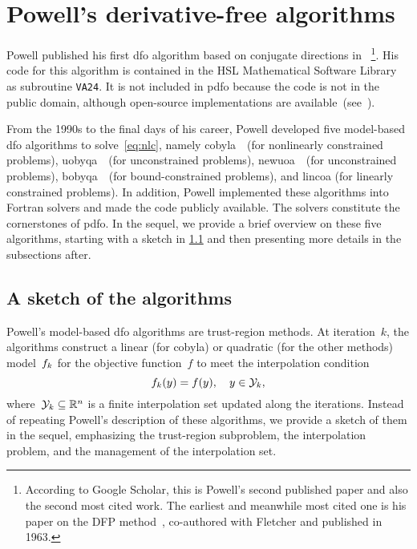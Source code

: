 \documentclass[11pt,draft]{article}
\numberwithin{equation}{section}
\newcommand{\R}{\mathbb{R}}
\newcommand{\obj}{f}
\newcommand{\objm}[1][k]{\obj\ifthenelse{\equal{#1}{}}{}{_{#1}}}
\newcommand{\xpt}[1][k]{\mathcal{Y}\ifthenelse{\equal{#1}{}}{}{_{#1}}}
\begin{document}
\section{Powell's derivative-free algorithms}
\label{sec:powell}

Powell published his first \gls{dfo} algorithm based on conjugate directions in \citeyear{Powell_1964}~\cite{Powell_1964}\footnote{According to Google Scholar, this is Powell's second published paper and also the second most cited work. The earliest and meanwhile most cited one is his paper on the DFP method~\cite{Fletcher_Powell_1963}, co-authored with Fletcher and published in 1963.}.
His code for this algorithm is contained in the HSL Mathematical Software Library~\cite{HSL} as subroutine \texttt{VA24}.
It is not included in \gls{pdfo} because the code is not in the public domain, although open-source implementations are available~(see~\cite[footnote~4]{Conn_Scheinberg_Toint_1997b}).

From the 1990s to the final days of his career, Powell developed five model-based \gls{dfo} algorithms to solve~\cref{eq:nlc}, namely \gls{cobyla}~\cite{Powell_1994}~(for nonlinearly constrained problems), \gls{uobyqa}~\cite{Powell_2002}~(for unconstrained problems), \gls{newuoa}~\cite{Powell_2006}~(for unconstrained problems), \gls{bobyqa}~\cite{Powell_2009}~(for bound-constrained problems),
and \gls{lincoa} (for linearly constrained problems).
In addition, Powell implemented these algorithms into Fortran solvers and made the code publicly available.
The solvers constitute the cornerstones of \gls{pdfo}.
In the sequel, we provide a brief overview on these five algorithms, starting with a sketch in \cref{ssec:sketch} and then presenting more details in the subsections after.

\subsection{A sketch of the algorithms}
\label{ssec:sketch}

Powell's model-based \gls{dfo} algorithms are trust-region methods.
At iteration~$k$, the algorithms construct a linear (for \gls{cobyla}) or quadratic (for the other methods) model~$\objm$ for the objective function~$f$ to meet the interpolation condition
\begin{equation}
    \label{eq:itpls}
    \objm(y) = \obj(y), \quad y \in \xpt,
\end{equation}
where~$\xpt \subseteq \R^n$ is a finite interpolation set updated along the iterations.
Instead of repeating Powell's description of these algorithms, we provide a sketch of them in the sequel, emphasizing the trust-region subproblem, the interpolation problem, and the management of the interpolation set.
\end{document}
